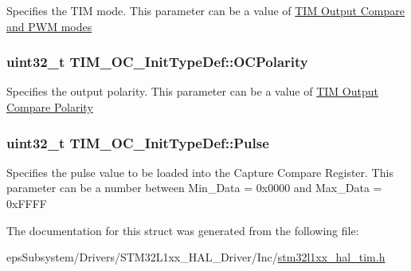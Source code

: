 Specifies the T\-I\-M mode. This parameter can be a value of \hyperlink{group___t_i_m___output___compare__and___p_w_m__modes}{T\-I\-M Output Compare and P\-W\-M modes} \hypertarget{struct_t_i_m___o_c___init_type_def_a556b7137d041aceed3e45c87cbfb39cd}{
\subsubsection[{O\-C\-Polarity}]{\setlength{\rightskip}{0pt plus 5cm}uint32\-\_\-t T\-I\-M\-\_\-\-O\-C\-\_\-\-Init\-Type\-Def\-::\-O\-C\-Polarity}}\label{struct_t_i_m___o_c___init_type_def_a556b7137d041aceed3e45c87cbfb39cd}
Specifies the output polarity. This parameter can be a value of \hyperlink{group___t_i_m___output___compare___polarity}{T\-I\-M Output Compare Polarity} \hypertarget{struct_t_i_m___o_c___init_type_def_a61fb5b9ef4154de67620ac81085a0e39}{
\subsubsection[{Pulse}]{\setlength{\rightskip}{0pt plus 5cm}uint32\-\_\-t T\-I\-M\-\_\-\-O\-C\-\_\-\-Init\-Type\-Def\-::\-Pulse}}\label{struct_t_i_m___o_c___init_type_def_a61fb5b9ef4154de67620ac81085a0e39}
Specifies the pulse value to be loaded into the Capture Compare Register. This parameter can be a number between Min\-\_\-\-Data = 0x0000 and Max\-\_\-\-Data = 0x\-F\-F\-F\-F 

The documentation for this struct was generated from the following file\-:\begin{DoxyCompactItemize}
\item 
eps\-Subsystem/\-Drivers/\-S\-T\-M32\-L1xx\-\_\-\-H\-A\-L\-\_\-\-Driver/\-Inc/\hyperlink{stm32l1xx__hal__tim_8h}{stm32l1xx\-\_\-hal\-\_\-tim.\-h}\end{DoxyCompactItemize}
